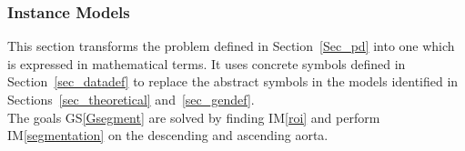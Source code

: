 \documentclass[12pt]{article}
\newcommand{\gsref}[1]{GS\ref{#1}}
\newcommand{\iref}[1]{IM\ref{#1}}
\begin{document}
\subsubsection{Instance Models} \label{sec_instance}    

This section transforms the problem defined in Section~\ref{Sec_pd} into 
one which is expressed in mathematical terms. It uses concrete symbols defined 
in Section~\ref{sec_datadef} to replace the abstract symbols in the models 
identified in Sections~\ref{sec_theoretical} and~\ref{sec_gendef}. \\

\noindent 
The goals \gsref{Gsegment} are solved by finding \iref{roi} and perform \iref{segmentation} on the descending and ascending aorta.

~\newline

\end{document}
